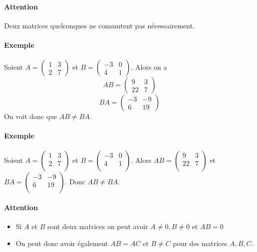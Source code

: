 \paragraph{Attention} Deux matrices quelconques ne commutent pas nécessairement.
\paragraph{Exemple} Soient $A = \begin{pmatrix} 1 & 3 \\ 2 & 7 \end{pmatrix}$ et $B = \begin{pmatrix} -3 & 0 \\ 4 & 1 \end{pmatrix}$. Alors on a
$$A B = \begin{pmatrix} 9 & 3 \\ 22 & 7 \end{pmatrix}$$
$$B A = \begin{pmatrix} -3 & -9 \\ 6 & 19 \end{pmatrix}$$
On voit donc que $A B \neq B A$.

\paragraph{Exemple} Soient $A=\begin{pmatrix}
  1 & 3 \\
 2 & 7 \\
\end{pmatrix}$ et $B=\begin{pmatrix}
  -3 & 0 \\
 4 & 1 \\
\end{pmatrix}$. Alors $AB=\begin{pmatrix}
  9 & 3 \\
 22 & 7 \\
\end{pmatrix}$ et $BA=\begin{pmatrix}
  -3 & -9 \\
 6 & 19 \\
\end{pmatrix}$. Donc $AB\neq BA$.

\paragraph{Attention}
\begin{itemize}
  \item Si $A$ et $B$ sont deux matrices on peut avoir $A \neq 0, B \neq 0$ et $AB = 0$
  \item On peut donc avoir également $AB = AC$ et $B \neq C$ pour des matrices $A, B, C$.
\end{itemize}


